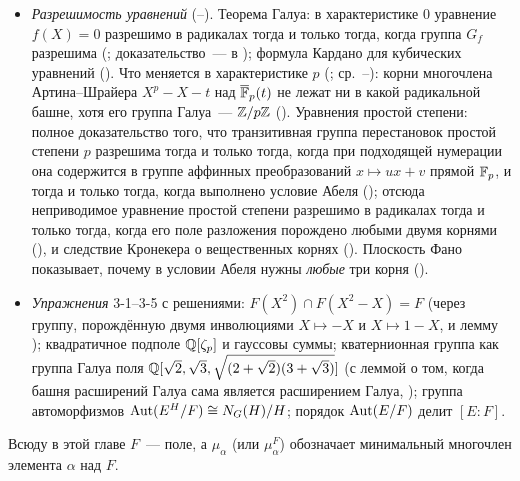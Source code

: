 \begin{itemize}[leftmargin=*]
множества корней неприводимых множителей (). Приводимые многочлены $f=f_1\cdots f_k$ (например, $f=gh$):
вложение $G_f\subset G_{f_1}\times\dots\times G_{f_k}$, его образ при $k=2$~--- расслоённое произведение (, через
), почему не всякий набор поднимается (), примеры () и разрешимость $G_f$ ().
\item \emph{Разрешимость уравнений} (--). Теорема Галуа: в характеристике $0$ уравнение $f(X)=0$
разрешимо в радикалах тогда и только тогда, когда группа $G_f$ разрешима (; доказательство~--- в );
формула Кардано для кубических уравнений (). Что меняется в характеристике $p$ (; ср.\
--): корни многочлена Артина--Шрайера $X^p-X-t$ над $\overline{\mathbb F}_p(t)$ не лежат ни в какой радикальной башне,
хотя его группа Галуа~--- $\mathbb Z/p\mathbb Z$ (\rf{3.29a}). Уравнения простой степени: полное доказательство того, что транзитивная группа перестановок
простой степени $p$ разрешима тогда и только тогда, когда при подходящей нумерации она содержится в группе аффинных
преобразований $x\mapsto ux+v$ прямой $\mathbb F_p$, и тогда и только тогда, когда выполнено условие Абеля (\rf{3.30a}); отсюда неприводимое уравнение простой степени разрешимо в радикалах
тогда и только тогда, когда его поле разложения порождено любыми двумя корнями (\rf{3.30b}), и следствие Кронекера о
вещественных корнях (\rf{3.30c}). Плоскость Фано показывает, почему в условии Абеля нужны \emph{любые} три корня
(\rf{3.30d}).
\item \emph{Упражнения} 3-1--3-5 с решениями: $F(X^2)\cap F(X^2-X)=F$ (через группу, порождённую двумя инволюциями
$X\mapsto-X$ и $X\mapsto1-X$, и лемму \rf{3.1a}); квадратичное подполе $\mathbb Q[\zeta_p]$ и гауссовы суммы; кватернионная группа
как группа Галуа поля $\mathbb Q[\sqrt2,\sqrt3,\sqrt{(2+\sqrt2)(3+\sqrt3)}]$ (с леммой о том, когда башня расширений Галуа сама
является расширением Галуа, \rf{3.30e}); группа автоморфизмов $\operatorname{Aut}(E^H/F)\cong N_G(H)/H$; порядок $\operatorname{Aut}(E/F)$ делит $[E:F]$.
\end{itemize}

Всюду в этой главе $F$~--- поле, а $\mu_\alpha$ (или $\mu^F_\alpha$) обозначает минимальный многочлен элемента $\alpha$ над $F$.
